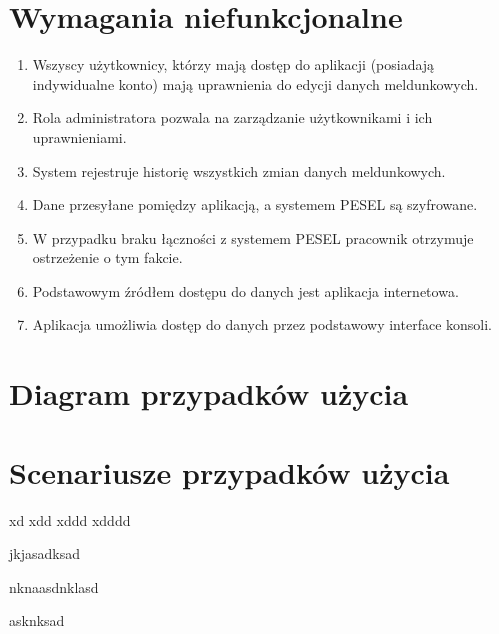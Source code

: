 \documentclass[12pt]{article}
\begin{document}
\section{Wymagania niefunkcjonalne}
\begin{enumerate}
    \item Wszyscy użytkownicy, którzy mają dostęp do aplikacji (posiadają indywidualne konto) mają uprawnienia do edycji danych meldunkowych.
    \item Rola administratora pozwala na zarządzanie użytkownikami i ich uprawnieniami.
    \item System rejestruje historię wszystkich zmian danych meldunkowych.
    \item Dane przesyłane pomiędzy aplikacją, a systemem PESEL są szyfrowane.
    \item W przypadku braku łączności z systemem PESEL pracownik otrzymuje ostrzeżenie o tym fakcie.
    \item Podstawowym źródłem dostępu do danych jest aplikacja internetowa.
    \item Aplikacja umożliwia dostęp do danych przez podstawowy interface konsoli.
\end{enumerate}
\newpage
\section{Diagram przypadków użycia}

\section{Scenariusze przypadków użycia}

\scenario
    {xd}
    {xdd}
    {xddd}
    {xdddd}
    {
        \item jkjasadksad
        \item nknaasdnklasd
        \item asknksad
    }
\end{document}
